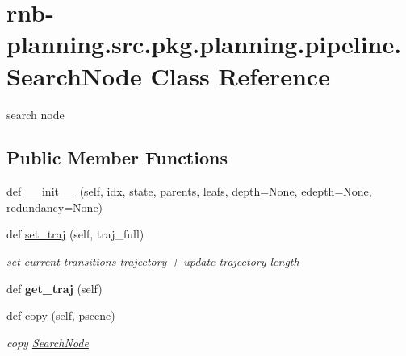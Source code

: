\hypertarget{classrnb-planning_1_1src_1_1pkg_1_1planning_1_1pipeline_1_1_search_node}{}\section{rnb-\/planning.src.\+pkg.\+planning.\+pipeline.\+Search\+Node Class Reference}
\label{classrnb-planning_1_1src_1_1pkg_1_1planning_1_1pipeline_1_1_search_node}


search node  


\subsection*{Public Member Functions}
\begin{DoxyCompactItemize}
\item 
def \hyperlink{classrnb-planning_1_1src_1_1pkg_1_1planning_1_1pipeline_1_1_search_node_a9c7920c7e5010de26dd5c846058e3202}{\+\_\+\+\_\+init\+\_\+\+\_\+} (self, idx, state, parents, leafs, depth=None, edepth=None, redundancy=None)
\item 
\mbox{\label{classrnb-planning_1_1src_1_1pkg_1_1planning_1_1pipeline_1_1_search_node_aa0388b7a38c100eb6387d001624f7ee4}} 
def \hyperlink{classrnb-planning_1_1src_1_1pkg_1_1planning_1_1pipeline_1_1_search_node_aa0388b7a38c100eb6387d001624f7ee4}{set\+\_\+traj} (self, traj\+\_\+full)
\begin{DoxyCompactList}\small\item\em set current transition\textquotesingle{}s trajectory + update trajectory length \end{DoxyCompactList}\item 
\mbox{\label{classrnb-planning_1_1src_1_1pkg_1_1planning_1_1pipeline_1_1_search_node_ac8664ba72f84f10fe59480f2bdf8bceb}} 
def {\bfseries get\+\_\+traj} (self)
\item 
def \hyperlink{classrnb-planning_1_1src_1_1pkg_1_1planning_1_1pipeline_1_1_search_node_aa6fea8bed1d1b1b1a967e7d6af26727f}{copy} (self, pscene)
\begin{DoxyCompactList}\small\item\em copy \hyperlink{classrnb-planning_1_1src_1_1pkg_1_1planning_1_1pipeline_1_1_search_node}{Search\+Node} \end{DoxyCompactList}\end{DoxyCompactItemize}

